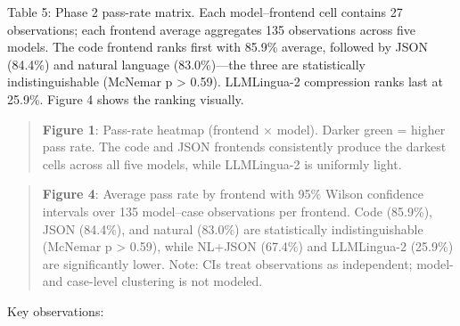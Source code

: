 Table 5: Phase 2 pass-rate matrix. Each model--frontend cell contains 27 observations; each frontend average aggregates 135 observations across five models. The code frontend ranks first with 85.9\% average, followed by JSON (84.4\%) and natural language (83.0\%)---the three are statistically indistinguishable (McNemar p \textgreater{} 0.59). LLMLingua-2 compression ranks last at 25.9\%. Figure 4 shows the ranking visually.



\begin{quote}

\textbf{Figure 1}: Pass-rate heatmap (frontend × model). Darker green = higher pass rate. The code and JSON frontends consistently produce the darkest cells across all five models, while LLMLingua-2 is uniformly light.

\end{quote}



\begin{quote}

\textbf{Figure 4}: Average pass rate by frontend with 95\% Wilson confidence intervals over 135 model--case observations per frontend. Code (85.9\%), JSON (84.4\%), and natural (83.0\%) are statistically indistinguishable (McNemar p \textgreater{} 0.59), while NL+JSON (67.4\%) and LLMLingua-2 (25.9\%) are significantly lower. Note: CIs treat observations as independent; model- and case-level clustering is not modeled.

\end{quote}



Key observations:




